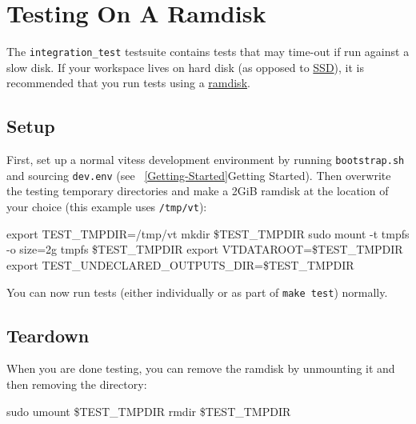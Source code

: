 \section{Testing On A Ramdisk}\hypertarget{testing-on-a-ramdisk}{}\label{testing-on-a-ramdisk}

The {\tt integration\_test} testsuite contains tests that may time-out if run against a slow disk. If your workspace lives on hard disk (as opposed to \href{http://en.wikipedia.org/wiki/Solid-state\_drive}{SSD}), it is recommended that you run tests using a \href{http://en.wikipedia.org/wiki/RAM\_drive}{ramdisk}.

\subsection{Setup}\hypertarget{setup}{}\label{setup}

First, set up a normal vitess development environment by running {\tt bootstrap.sh} and sourcing {\tt dev.env} (see ~\ref{Getting-Started}{Getting Started}). Then overwrite the testing temporary directories and make a 2GiB ramdisk at the location of your choice (this example uses {\tt /tmp/vt}):

\begin{codesample2}
  export TEST_TMPDIR=/tmp/vt
  mkdir \${TEST_TMPDIR}
  sudo mount -t tmpfs -o size=2g tmpfs \${TEST_TMPDIR}
  export VTDATAROOT=\${TEST_TMPDIR}
  export TEST_UNDECLARED_OUTPUTS_DIR=\${TEST_TMPDIR}
\end{codesample2}


You can now run tests (either individually or as part of {\tt make test}) normally.

\subsection{Teardown}\hypertarget{teardown}{}\label{teardown}

When you are done testing, you can remove the ramdisk by unmounting it and then removing the directory:

\begin{codesample2}
  sudo umount \${TEST_TMPDIR}
  rmdir \${TEST_TMPDIR}
\end{codesample2}

